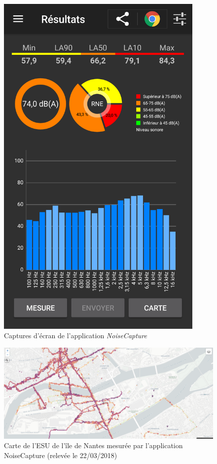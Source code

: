 \begin{figure}[t]
\begin{center}
\begin{minipage}[t]{0.3\textwidth}
        \includegraphics[width=0.9\textwidth]{./figures/autres/noiseCapture2.png}
    \end{minipage}
    \caption{Captures d'écran de l'application \textit{NoiseCapture}}
\end{center}
\end{figure}


\begin{figure}[t]
\centering
\includegraphics[width=0.7\linewidth]{./figures/cartographie/noise_modelling.PNG}
\caption{Carte de l'ESU de l'île de Nantes mesurée par l'application NoiseCapture  (relevée le 22/03/2018)}
\label{fig:carte_noiseModelling}
\end{figure}

